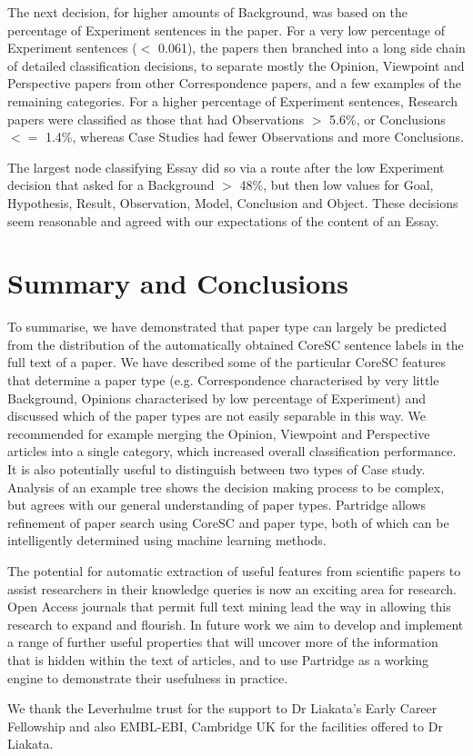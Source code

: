 \documentclass{svmult}
\begin{document}
The next decision, for higher amounts of Background, was based on the
percentage of Experiment sentences in the paper. For a very low
percentage of Experiment sentences ($<$ 0.061), the papers then
branched into a long side chain of detailed classification decisions,
to separate mostly the Opinion, Viewpoint and Perspective papers from
other Correspondence papers, and a few examples of the remaining
categories. For a higher percentage of Experiment sentences, Research
papers were classified as those that had Observations $>$ 5.6\%, or
Conclusions $<=$ 1.4\%, whereas Case Studies had fewer Observations
and more Conclusions.

The largest node classifying Essay did so via a route after the low
Experiment decision that asked for a Background $>$ 48\%, but then low
values for Goal, Hypothesis, Result, Observation, Model, Conclusion
and Object. These decisions seem reasonable and agreed with our
expectations of the content of an Essay.

\section{Summary and Conclusions}
\label{sec:4}
To summarise, we have demonstrated that paper type can largely be predicted
from the distribution of the automatically obtained CoreSC sentence labels in
the full text of a paper. We have described some of the particular CoreSC
features that determine a paper type (e.g. Correspondence characterised by very
little Background, Opinions characterised by low percentage of Experiment) and
discussed which of the paper types are not easily separable in this way. We
recommended for example merging the Opinion, Viewpoint and Perspective articles
into a single category, which increased overall classification performance. It
is also potentially useful to distinguish between two types of Case study.
Analysis of an example tree shows the decision making process to be complex,
but agrees with our general understanding of paper types. Partridge allows refinement of paper search using CoreSC and paper type, both of which
can be intelligently determined using machine learning methods.



The potential for automatic extraction of useful features from
scientific papers to assist researchers in their knowledge queries is
now an exciting area for research. Open Access journals that permit
full text mining lead the way in allowing this research to expand and
flourish. In future work we aim to develop and implement a range of
further useful properties that will uncover more of the information
that is hidden within the text of articles, and to use Partridge as a
working engine to demonstrate their usefulness in practice.

\begin{acknowledgement} We thank the Leverhulme trust for the support to Dr
Liakata's Early Career Fellowship and also EMBL-EBI, Cambridge UK for the
facilities offered to Dr Liakata.  \end{acknowledgement}




%
\end{document}
